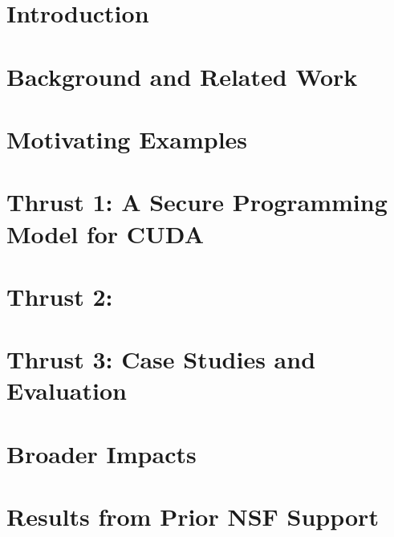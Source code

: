 \documentclass[11pt]{article}
\newif\ifsplit
\begin{document}






 




\section{Introduction}


\section{Background and Related Work}


\section{Motivating Examples}


\section{Thrust 1: A Secure Programming Model for CUDA}


\section{Thrust 2: }


\section{Thrust 3: Case Studies and Evaluation}


\section{Broader Impacts}


\section{Results from Prior NSF Support}


\ifsplit
\else
\FloatBarrier
\newpage



\fi
\end{document}
